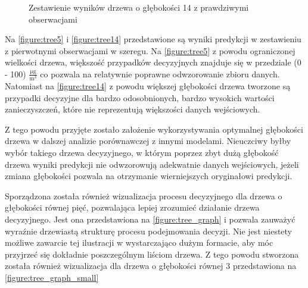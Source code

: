 \documentclass[10pt,a4paper]{article}
\begin{document}
\FloatBarrier
\begin{figure}[!ht]
	\centering
	\caption{Zestawienie wyników drzewa o głębokości 14 z prawdziwymi obserwacjami}
	\label{figure:tree14}
\end{figure}
\FloatBarrier

Na \autoref{figure:tree5} i \autoref{figure:tree14} przedstawione są wyniki predykcji w zestawieniu z pierwotnymi obserwacjami w szeregu. Na \autoref{figure:tree5} z powodu ograniczonej wielkości drzewa, większość przypadków decyzyjnych znajduje się w przedziale (0 - 100) $\frac{\si{\micro\gram}}{\si\meter^3}$ co pozwala na relatywnie poprawne odwzorowanie zbioru danych. Natomiast na \autoref{figure:tree14} z powodu większej głębokości drzewa tworzone są przypadki decyzyjne dla bardzo odosobnionych, bardzo wysokich wartości zanieczyszczeń, które nie reprezentują większości danych wejściowych. 

Z tego powodu przyjęte zostało założenie wykorzystywania optymalnej głębokości drzewa w dalszej analizie porównawczej z innymi modelami. Nieuczciwy byłby wybór takiego drzewa decyzyjnego, w którym poprzez zbyt dużą głębokość drzewa wyniki predykcji nie odwzorowują adekwatnie danych wejściowych, jeżeli zmiana głębokości pozwala na otrzymanie wierniejszych oryginałowi predykcji.

Sporządzona została również wizualizacja procesu decyzyjnego dla drzewa o głębokości równej pięć, pozwalająca lepiej zrozumieć działanie drzewa decyzyjnego. Jest ona przedstawiona na \autoref{figure:tree_graph} i pozwala zauważyć wyraźnie drzewiastą strukturę procesu podejmowania decyzji. Nie jest niestety możliwe zawarcie tej ilustracji w wystarczająco dużym formacie, aby móc przyjrzeć się dokładnie poszczególnym liściom drzewa. Z tego powodu stworzona została również wizualizacja dla drzewa o głębokości równej 3 przedstawiona na \autoref{figure:tree_graph_small}
\end{document}
